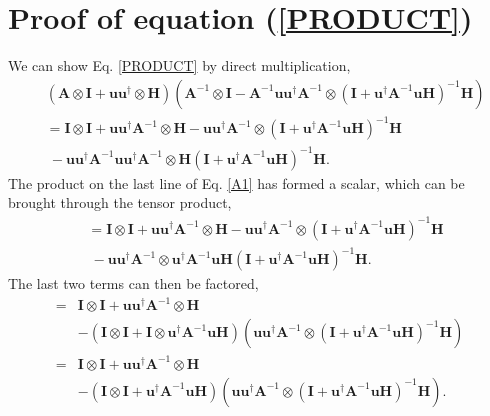 \appendix
\section{Proof of equation (\ref{PRODUCT})} \label{sec:proof}

We can show Eq. \eqref{PRODUCT} by direct multiplication,
\begin{align}
&\left(\mathbf{A} \otimes \mathbf{I} + \mathbf{u}\mathbf{u}^\dagger \otimes \mathbf{H} \right) 
 \left( \mathbf{A}^{-1} \otimes \mathbf{I} - \mathbf{A}^{-1}\mathbf{u}\mathbf{u}^\dagger\mathbf{A}^{-1} \otimes \left(\mathbf{I} + \mathbf{u}^\dagger\mathbf{A}^{-1}\mathbf{u} \mathbf{H}\right)^{-1} \mathbf{H} \right)
 \nonumber \\
 &= \mathbf{I} \otimes \mathbf{I} + \mathbf{u}\mathbf{u}^\dagger\mathbf{A}^{-1} \otimes \mathbf{H} - \mathbf{u}\mathbf{u}^\dagger\mathbf{A}^{-1}\otimes \left(\mathbf{I} + \mathbf{u}^\dagger\mathbf{A}^{-1}\mathbf{u} \mathbf{H}\right)^{-1} \mathbf{H}
\nonumber \\
&~- \mathbf{u}\mathbf{u}^\dagger\mathbf{A}^{-1}\mathbf{u}\mathbf{u}^\dagger\mathbf{A}^{-1}\otimes \mathbf{H} \left(\mathbf{I} + \mathbf{u}^\dagger\mathbf{A}^{-1}\mathbf{u} \mathbf{H}\right)^{-1} \mathbf{H}. \label{A1}
\end{align}
The product on the last line of Eq. \eqref{A1} has formed a scalar, which can be brought through the tensor product,
\begin{align}
&= \mathbf{I} \otimes \mathbf{I} + \mathbf{u}\mathbf{u}^\dagger\mathbf{A}^{-1} \otimes \mathbf{H} - \mathbf{u}\mathbf{u}^\dagger\mathbf{A}^{-1}\otimes \left(\mathbf{I} + \mathbf{u}^\dagger\mathbf{A}^{-1}\mathbf{u} \mathbf{H}\right)^{-1} \mathbf{H}
\nonumber \\
&~- \mathbf{u}\mathbf{u}^\dagger\mathbf{A}^{-1}\otimes \mathbf{u}^\dagger\mathbf{A}^{-1}\mathbf{u}\mathbf{H} \left(\mathbf{I} + \mathbf{u}^\dagger\mathbf{A}^{-1}\mathbf{u}\mathbf{H}\right)^{-1} \mathbf{H}. 
\end{align}
The last two terms can then be factored,
\begin{align}
=& \mathbf{I} \otimes \mathbf{I} + \mathbf{u}\mathbf{u}^\dagger\mathbf{A}^{-1} \otimes \mathbf{H} 
\\ \nonumber &- \left( \mathbf{I} \otimes \mathbf{I} + \mathbf{I} \otimes \mathbf{u}^\dagger\mathbf{A}^{-1}\mathbf{u} \mathbf{H}\right)
 \left( \mathbf{u}\mathbf{u}^\dagger\mathbf{A}^{-1} \otimes \left(\mathbf{I} + \mathbf{u}^\dagger\mathbf{A}^{-1}\mathbf{u}\mathbf{H}\right)^{-1} \mathbf{H}\right)
\\ =& \mathbf{I} \otimes \mathbf{I} + \mathbf{u}\mathbf{u}^\dagger\mathbf{A}^{-1} \otimes \mathbf{H} 
\\ \nonumber &- \left( \mathbf{I} \otimes \mathbf{I} + \mathbf{u}^\dagger\mathbf{A}^{-1}\mathbf{u} \mathbf{H} \right)
 \left( \mathbf{u}\mathbf{u}^\dagger\mathbf{A}^{-1} \otimes \left(\mathbf{I} + \mathbf{u}^\dagger\mathbf{A}^{-1}\mathbf{u}\mathbf{H}\right)^{-1} \mathbf{H}\right).
 \end{align}
